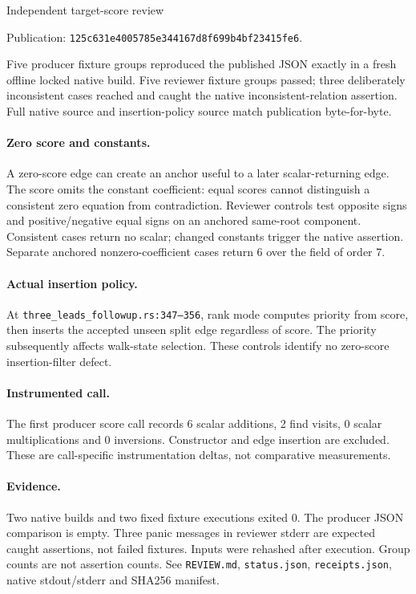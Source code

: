 \documentclass[11pt]{article}
\begin{document}
\begin{center}\Large Independent target-score review\end{center}
Publication: \texttt{125c631e4005785e344167d8f699b4bf23415fe6}.

Five producer fixture groups reproduced the published JSON exactly in a fresh offline locked native build. Five reviewer fixture groups passed; three deliberately inconsistent cases reached and caught the native inconsistent-relation assertion. Full native source and insertion-policy source match publication byte-for-byte.

\paragraph{Zero score and constants.} A zero-score edge can create an anchor useful to a later scalar-returning edge. The score omits the constant coefficient: equal scores cannot distinguish a consistent zero equation from contradiction. Reviewer controls test opposite signs and positive/negative equal signs on an anchored same-root component. Consistent cases return no scalar; changed constants trigger the native assertion. Separate anchored nonzero-coefficient cases return 6 over the field of order 7.

\paragraph{Actual insertion policy.} At \texttt{three\_leads\_followup.rs:347--356}, rank mode computes priority from score, then inserts the accepted unseen split edge regardless of score. The priority subsequently affects walk-state selection. These controls identify no zero-score insertion-filter defect.

\paragraph{Instrumented call.} The first producer score call records 6 scalar additions, 2 find visits, 0 scalar multiplications and 0 inversions. Constructor and edge insertion are excluded. These are call-specific instrumentation deltas, not comparative measurements.

\paragraph{Evidence.} Two native builds and two fixed fixture executions exited 0. The producer JSON comparison is empty. Three panic messages in reviewer stderr are expected caught assertions, not failed fixtures. Inputs were rehashed after execution. Group counts are not assertion counts. See \texttt{REVIEW.md}, \texttt{status.json}, \texttt{receipts.json}, native stdout/stderr and SHA256 manifest.
\end{document}
